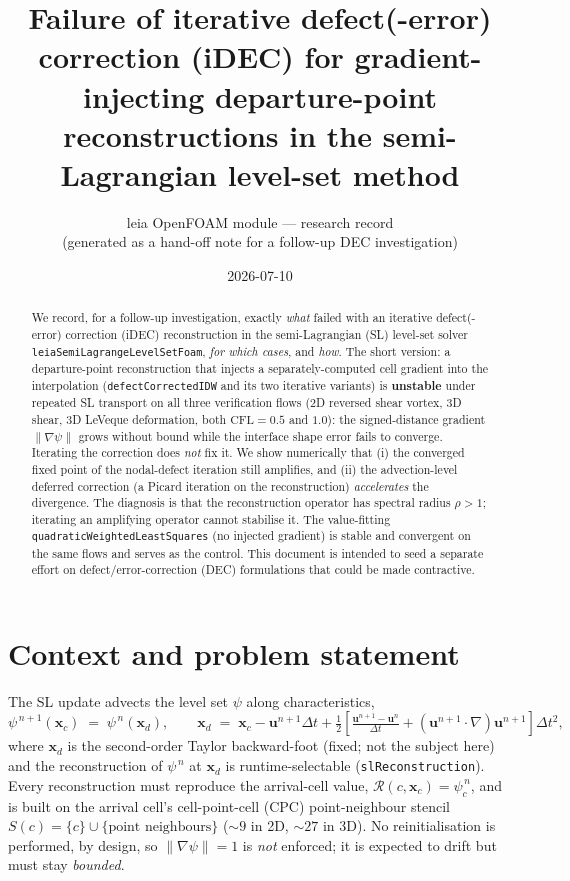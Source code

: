 \documentclass[11pt]{article}
\title{Failure of iterative defect(-error) correction (iDEC) for
gradient-injecting departure-point reconstructions in the
semi-Lagrangian level-set method}
\author{leia OpenFOAM module --- research record\\
\small (generated as a hand-off note for a follow-up DEC investigation)}
\date{2026-07-10}
\newcommand{\gradpsi}{\lVert\nabla\psi\rVert}
\newcommand{\code}[1]{\texttt{#1}}
\begin{document}
\maketitle

\begin{abstract}
We record, for a follow-up investigation, exactly \emph{what} failed with an
iterative defect(-error) correction (iDEC) reconstruction in the semi-Lagrangian
(SL) level-set solver \code{leiaSemiLagrangeLevelSetFoam}, \emph{for which cases},
and \emph{how}. The short version: a departure-point reconstruction that injects a
separately-computed cell gradient into the interpolation (\code{defectCorrectedIDW}
and its two iterative variants) is \textbf{unstable} under repeated SL transport on
all three verification flows (2D reversed shear vortex, 3D shear, 3D LeVeque
deformation, both $\mathrm{CFL}=0.5$ and $1.0$): the signed-distance gradient
$\gradpsi$ grows without bound while the interface shape error fails to converge.
Iterating the correction does \emph{not} fix it. We show numerically that (i) the
converged fixed point of the nodal-defect iteration still amplifies, and (ii) the
advection-level deferred correction (a Picard iteration on the reconstruction)
\emph{accelerates} the divergence. The diagnosis is that the reconstruction
operator has spectral radius $\rho>1$; iterating an amplifying operator cannot
stabilise it. The value-fitting \code{quadraticWeightedLeastSquares} (no injected
gradient) is stable and convergent on the same flows and serves as the control.
This document is intended to seed a separate effort on defect/error-correction
(DEC) formulations that could be made contractive.
\end{abstract}

\section{Context and problem statement}

The SL update advects the level set $\psi$ along characteristics,
\begin{equation}
\psi^{\,n+1}(\mathbf{x}_c) \;=\; \psi^{\,n}(\mathbf{x}_d),
\qquad
\mathbf{x}_d \;=\; \mathbf{x}_c - \mathbf{u}^{n+1}\Delta t
+ \tfrac12\!\left[\tfrac{\mathbf{u}^{n+1}-\mathbf{u}^{n}}{\Delta t}
+ (\mathbf{u}^{n+1}\!\cdot\nabla)\mathbf{u}^{n+1}\right]\!\Delta t^2 ,
\end{equation}
where $\mathbf{x}_d$ is the second-order Taylor backward-foot (fixed; not the
subject here) and the reconstruction of $\psi^{\,n}$ at $\mathbf{x}_d$ is
runtime-selectable (\code{slReconstruction}). Every reconstruction must reproduce
the arrival-cell value, $\mathcal{R}(c,\mathbf{x}_c)=\psi^{\,n}_c$, and is built on
the arrival cell's cell-point-cell (CPC) point-neighbour stencil
$S(c)=\{c\}\cup\{\text{point neighbours}\}$ (${\sim}9$ in 2D, ${\sim}27$ in 3D).
No reinitialisation is performed, by design, so $\gradpsi=1$ is \emph{not} enforced;
it is expected to drift but must stay \emph{bounded}.
\end{document}
